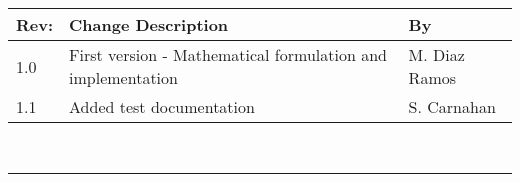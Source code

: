 \documentclass[]{BasiliskReportMemo}
\begin{document}
\makeCover

%
%
\pagestyle{empty}
{\renewcommand{\arraystretch}{2}
	\noindent
	\begin{longtable}{|p{0.5in}|p{4.5in}|p{1.14in}|}
		\hline
		{\bfseries Rev}: & {\bfseries Change Description} & {\bfseries By} \\
		\hline
		1.0 & First version - Mathematical formulation and implementation & M. Diaz Ramos \\
		\hline
		1.1 & Added test documentation & S. Carnahan \\
		\hline
		
	\end{longtable}
}

\newpage
\setcounter{page}{1}
\pagestyle{fancy}

\tableofcontents %
~\\ \hrule ~\\ %
	















\end{document}
